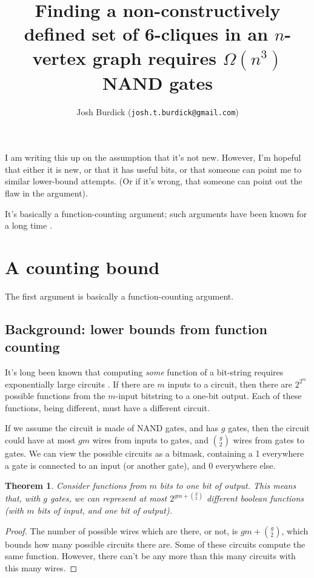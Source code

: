 \documentclass[12pt]{article}
\newtheorem{thm}{Theorem}[section]
\theoremstyle{definition}
\begin{document}
\title{Finding a non-constructively defined set of 6-cliques in an
$n$-vertex graph requires $\Omega(n^3)$ NAND gates}

\author{Josh Burdick ({\tt josh.t.burdick@gmail.com})}
\maketitle

I am writing this up on the assumption that it's not new.
However, I'm hopeful that either it is new, or that it has useful bits,
or that someone can point me
to similar lower-bound attempts. (Or if it's wrong, that 
someone can point out the flaw in the argument).

It's basically a function-counting argument; such arguments have been known for
a long time \cite{shannon_synthesis_1949}.

\tableofcontents

\section{A counting bound}

The first argument is basically a function-counting argument.

\subsection{Background: lower bounds from function counting}

It's long been known that computing {\em some} function of a bit-string
requires exponentially large circuits \cite{shannon_synthesis_1949}.
If there are $m$ inputs to a circuit,
then there are $2^{2^m}$ possible functions from the $m$-input bitstring to
a one-bit output. Each of these functions, being different, must have a
different circuit.

If we assume the circuit is made of NAND gates, and has $g$ gates, then the
circuit could have at most $gm$ wires from inputs to gates, and ${g \choose 2}$
wires from gates to gates. We can view the possible circuits as a bitmask,
containing a 1 everywhere a gate is connected to an input (or another gate),
and 0 everywhere else.

\begin{thm}
\label{boundFromCounting}
Consider functions from $m$ bits to one bit of output.
This means that, with $g$ gates, we can represent at most
$2^{gm + {g \choose 2}}$ different boolean functions (with $m$ bits of input,
and one bit of output).
\end{thm}
\begin{proof}

The number of possible wires which are there, or not, is $gm + {g \choose 2}$,
which bounds how many possible circuits there are.
Some of these circuits compute the same function.
However, there can't be any more than this many circuits with this many wires.
\end{proof}
\end{document}
